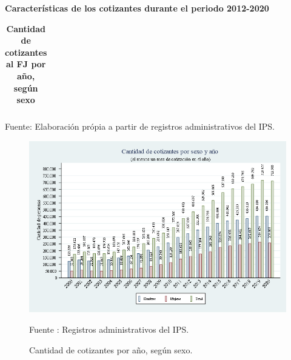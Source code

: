 \textbf{Características de los cotizantes durante el periodo 2012-2020}

\begin{table}[H]
\begin{center}
\scriptsize     
\caption{\bf{Cantidad de cotizantes al FJ por año, según sexo}}
\begin{tabular}{l|rrrrrrrrrrrrr}

\end{tabular}
                    \item Fuente: Elaboración própia a partir de registros administrativos del IPS.
\end{center}
\end{table}

\begin{figure}[H]
\begin{center}
                    \caption{Cantidad de cotizantes por año, según sexo.}
                    \includegraphics[scale=0.55]{RA_IPS_cotizaciones_2010a2020_year_almenos_un_mes_year.png}
                                    \item \footnotesize Fuente : Registros administrativos del IPS. 
                    \end{center}
\end{figure}

